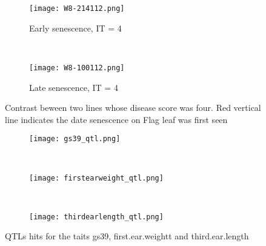 \documentclass{frontiersSCNS} %
\begin{document}
\begin{figure}
    \begin{center}
    \begin{subfigure}[b]{0.5\textwidth}
        \texttt{[image: W8-214112.png]}
        \caption{Early senescence, IT = 4}
    \end{subfigure}
    ~ %
    \begin{subfigure}[b]{0.5\textwidth}
        \texttt{[image: W8-100112.png]}
        \caption{Late senescence, IT = 4}
    \end{subfigure}
\end{center}
    \caption{Contrast beween two lines whose disease score was four. Red vertical line indicates the date senescence on Flag leaf was first seen}\label{fig3}
\end{figure}


\begin{figure}
    \begin{center}
    \begin{subfigure}[b]{1\textwidth}
        \texttt{[image: gs39\_qtl.png]}
        \caption{}
        \label{fig:gs39}
    \end{subfigure}
    ~ %
\begin{subfigure}[b]{1\textwidth}
        \texttt{[image: firstearweight\_qtl.png]}
        \caption{}
       \label{fig:firstearweight}
    \end{subfigure}
    ~ %
    \begin{subfigure}[b]{1\textwidth}
        \texttt{[image: thirdearlength\_qtl.png]}
        \caption{}
        \label{fig:thirdearlength}
    \end{subfigure}
\end{center}
    \caption{QTLs hits for the taits gs39, first.ear.weightt and third.ear.length}\label{fig4}


\end{figure}
\end{document}

